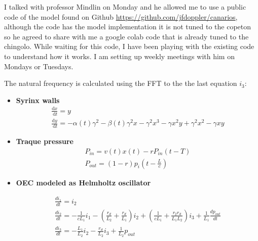 \documentclass{article}
\begin{document}
    I talked with professor Mindlin on Monday and he allowed me to use a public code of the model found on Github \url{https://github.com/jfdoppler/canarios}, although the code has the model implementation it is not tuned to the copeton so he agreed to share with me a google colab code that is already tuned to the chingolo. While waiting for this code, I have been playing with the existing code to understand how it works. I am setting up  weekly meetings with him on Mondays or Tuesdays.
    
    
    \newpage
    The natural frequency is calculated using the FFT to the the last equation $i_3$:
    
    \begin{itemize}
        \item \textbf{Syrinx walls}
        \begin{equation}
        \begin{gathered}
        \frac{\mathrm{d} x}{\mathrm{~d} t}=y \\
        \frac{\mathrm{d} y}{\mathrm{~d} t}=-\alpha(t) \gamma^2-\beta(t) \gamma^2 x-\gamma^2 x^3-\gamma x^2 y+\gamma^2 x^2-\gamma x y 
        \end{gathered}
        \end{equation}
        
        
    \item \textbf{Traque pressure}
    \begin{equation}
    \begin{gathered}
    P_{in} = v(t)x(t)-rP_{in}(t-T)\\
    P_{out} = (1-r)p_i\left( t - \frac{L}{c} \right)
    \end{gathered}
    \end{equation}
    
    \item \textbf{OEC modeled as Helmholtz oscillator}
    
    \begin{equation}
         \begin{gathered}
        \frac{d i_1}{dt} = i_2\\
        \frac{d i_2}{dt} = -\frac{1}{c L_1}i_1  - \left( \frac{r_d}{L_2} + \frac{r_d}{L_1}\right) i_2 + \left( \frac{1}{cL_1} + \frac{r_2r_d}{L_1 L_2}\right) i_3 + \frac{1}{L_1}\frac{dp_{out} }{dt}\\
        \frac{d i_3}{dt} = -  \frac{L_1}{L_2}  i_2 - \frac{r_d}{L_2} i_3 + \frac{1}{L_2} p_{out}
    \end{gathered}
     \end{equation}
    \end{itemize}
    
    
    
    
    
     
\end{document}
